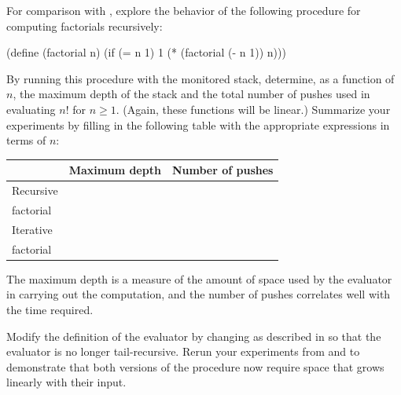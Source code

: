 \begin{exercise}
	\label{Exercise 5.27}
	For comparison with , explore the behavior of the following procedure for computing factorials recursively:
	\begin{scheme}
	  (define (factorial n)
	    (if (= n 1) 1 (* (factorial (- n 1)) n)))
	\end{scheme}
	By running this procedure with the monitored stack, determine, as a function of \( n \), the maximum depth of the stack and the total number of pushes used in evaluating \( n! \) for \( n ≥ 1 \).
	(Again, these functions will be linear.)
	Summarize your experiments by filling in the following table with the appropriate expressions in terms of \( n \):
	\begin{center}
		\begin{tabular}{lll}
			{}        & Maximum depth & Number of pushes  \\
			\midrule
			Recursive & {}            & {}                \\
			factorial & {}            & {}                \\
			\midrule
			Iterative & {}            & {}                \\
			factorial & {}            & {}                \\
			\midrule
		\end{tabular}
	\end{center}
	The maximum depth is a measure of the amount of space used by the evaluator in carrying out the computation, and the number of pushes correlates well with the time required.
\end{exercise}

\begin{exercise}
	\label{Exercise 5.28}
	Modify the definition of the evaluator by changing  as described in  so that the evaluator is no longer tail-recursive.
	Rerun your experiments from  and  to demonstrate that both versions of the  procedure now require space that grows linearly with their input.
\end{exercise}

